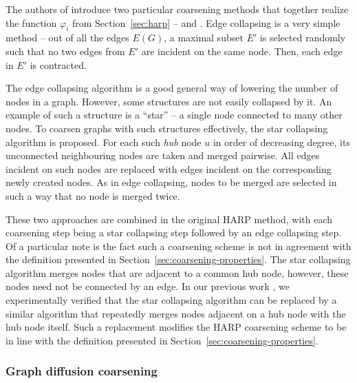 The authors of \cite{chen_harp_2018} introduce two particular coarsening methods that together realize the function \( \varphi_i \) from Section~\ref{sec:harp} --  and . Edge collapsing is a very simple method -- out of all the edges \( E \left( G \right) \), a maximal subset \( E' \) is selected randomly such that no two edges from \( E' \) are incident on the same node. Then, each edge in \( E' \) is contracted.

The edge collapsing algorithm is a good general way of lowering the number of nodes in a graph. However, some structures are not easily collapsed by it. An example of such a structure is a \enquote{star} -- a single node connected to many other nodes. To coarsen graphs with such structures effectively, the star collapsing algorithm is proposed. For each such \textit{hub} node \( u \) in order of decreasing degree, its unconnected neighbouring nodes are taken and merged pairwise. All edges incident on such nodes are replaced with edges incident on the corresponding newly created nodes. As in edge collapsing, nodes to be merged are selected in such a way that no node is merged twice.

These two approaches are combined in the original HARP method, with each coarsening step being a star collapsing step followed by an edge collapsing step. Of a particular note is the fact such a coarsening scheme is not in agreement with the definition presented in Section~\ref{sec:coarsening-properties}. The star collapsing algorithm merges nodes that are adjacent to a common hub node, however, these nodes need not be connected by an edge. In our previous work \cite{dedic_graph_2021}, we experimentally verified that the star collapsing algorithm can be replaced by a similar algorithm that repeatedly merges nodes adjacent on a hub node with the hub node itself. Such a replacement modifies the HARP coarsening scheme to be in line with the definition presented in Section~\ref{sec:coarsening-properties}.

\subsubsection{Graph diffusion coarsening}\label{sec:gdc-coarsening}

